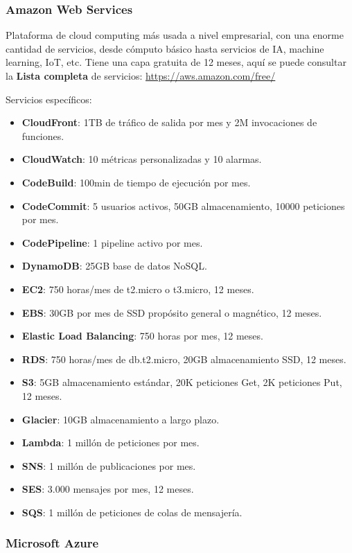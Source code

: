 \subsubsection*{Amazon Web Services}

Plataforma de cloud computing más usada a nivel empresarial, con una enorme cantidad de servicios, desde cómputo básico hasta servicios de IA, machine learning, IoT, etc. Tiene una capa gratuita de 12 meses, aquí se puede consultar la \textbf{Lista completa} de servicios: \url{https://aws.amazon.com/free/}

Servicios específicos:
\begin{itemize}
	\item \textbf{CloudFront}: 1TB de tráfico de salida por mes y 2M invocaciones de funciones.
	\item \textbf{CloudWatch}: 10 métricas personalizadas y 10 alarmas.
	\item \textbf{CodeBuild}: 100min de tiempo de ejecución por mes.
	\item \textbf{CodeCommit}: 5 usuarios activos, 50GB almacenamiento, 10000 peticiones por mes.
	\item \textbf{CodePipeline}: 1 pipeline activo por mes.
	\item \textbf{DynamoDB}: 25GB base de datos NoSQL.
	\item \textbf{EC2}: 750 horas/mes de t2.micro o t3.micro, 12 meses.
	\item \textbf{EBS}: 30GB por mes de SSD propósito general o magnético, 12 meses.
	\item \textbf{Elastic Load Balancing}: 750 horas por mes, 12 meses.
	\item \textbf{RDS}: 750 horas/mes de db.t2.micro, 20GB almacenamiento SSD, 12 meses.
	\item \textbf{S3}: 5GB almacenamiento estándar, 20K peticiones Get, 2K peticiones Put, 12 meses.
	\item \textbf{Glacier}: 10GB almacenamiento a largo plazo.
	\item \textbf{Lambda}: 1 millón de peticiones por mes.
	\item \textbf{SNS}: 1 millón de publicaciones por mes.
	\item \textbf{SES}: 3.000 mensajes por mes, 12 meses.
	\item \textbf{SQS}: 1 millón de peticiones de colas de mensajería.
\end{itemize}

\subsubsection*{Microsoft Azure}

